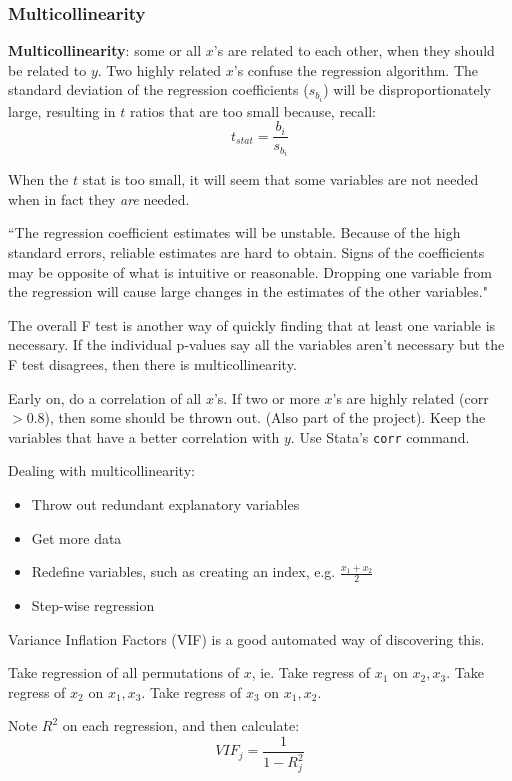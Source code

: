 \documentclass[11pt, oneside]{article}   	%
\begin{document}
\subsubsection{Multicollinearity}

\textbf{Multicollinearity}: some or all $x$'s are related to each other, when they should be related to $y$. Two highly related $x$'s  confuse the regression algorithm. The standard deviation of the regression coefficients ($s_{b_i}$) will be disproportionately large, resulting in $t$ ratios that are too small because, recall:
\[
t_{stat} = \frac{b_i} {s_{b_i}}
\]

When the $t$ stat is too small, it will seem that some variables are not needed when in fact they \textit{are} needed.

``The regression coefficient estimates will be unstable. Because of the high standard errors, reliable estimates are hard to obtain. Signs of the coefficients may be opposite of what is intuitive or reasonable. Dropping one variable from the regression will cause large changes in the estimates of the other variables."

The overall F test is another way of quickly finding that at least one variable is necessary. If the individual p-values say all the variables aren't necessary but the F test disagrees, then there is multicollinearity.

Early on, do a correlation of all $x$'s. If two or more $x$'s are highly related (corr $> 0.8$), then some should be thrown out. (Also part of the project). Keep the variables that have a better correlation with $y$. Use Stata's \texttt{corr} command.

Dealing with multicollinearity:
\begin{itemize}
\item{Throw out redundant explanatory variables}
\item{Get more data}
\item{Redefine variables, such as creating an index, e.g. $\frac{x_1 + x_2}{2}$}
\item{Step-wise regression}
\end{itemize}

Variance Inflation Factors (VIF) is a good automated way of discovering this. 

Take regression of all permutations of $x$, ie. 
Take regress of $x_1$ on $x_2, x_3$.
Take regress of $x_2$ on $x_1, x_3$.
Take regress of $x_3$ on $x_1, x_2$.

Note $R^2$ on each regression, and then calculate:
\[
VIF_j = \frac{1} {1-R^2_j}
\]
\end{document}
